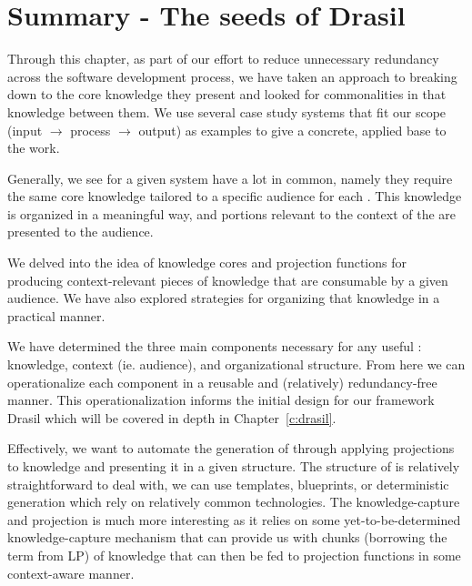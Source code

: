   
\section{Summary - The seeds of Drasil}


Through this chapter, as part of our effort to reduce unnecessary redundancy 
across the software development process, we have taken an approach to breaking 
down \sfs{} to the core knowledge they present and looked for commonalities in 
that knowledge between them. We use several case study systems that fit our 
scope (input $\rightarrow$ process $\rightarrow$ output) as examples to give a 
concrete, applied base to the work.

Generally, we see \sfs{} for a given system have a lot in common, namely they 
require the same core knowledge tailored to a specific audience for each \sf{}. 
This knowledge is organized in a meaningful way, and portions relevant to the 
context of the \sf{} are presented to the audience.

We delved into the idea of knowledge cores and projection functions for 
producing context-relevant pieces of knowledge that are consumable by a given 
audience. We have also explored strategies for organizing that knowledge in a 
practical manner. 

We have determined the three main components necessary for any useful \sf{}: 
knowledge, context (ie. audience), and organizational structure. From here we 
can operationalize each component in a reusable and (relatively) 
redundancy-free manner. This operationalization informs the initial design for 
our framework Drasil which will be covered in depth in Chapter~\ref{c:drasil}. 

Effectively, we want to automate the generation of \sfs{} through applying 
projections to knowledge and presenting it in a given structure. The structure 
of \sfs{} is relatively straightforward to deal with, we can use templates, 
blueprints, or deterministic generation which rely on relatively common 
technologies. The knowledge-capture and projection is much more interesting as 
it relies on some yet-to-be-determined knowledge-capture mechanism that can 
provide us with chunks (borrowing the term from LP) of knowledge that can then 
be fed to projection functions in some context-aware manner.


